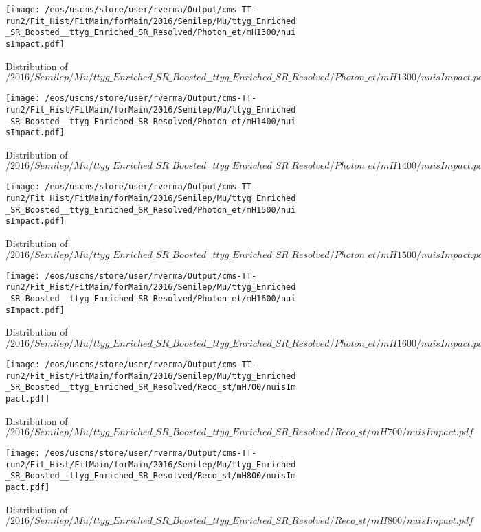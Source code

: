 \begin{figure}
\centering
\texttt{[image: /eos/uscms/store/user/rverma/Output/cms-TT-run2/Fit\_Hist/FitMain/forMain/2016/Semilep/Mu/ttyg\_Enriched\_SR\_Boosted\_\_ttyg\_Enriched\_SR\_Resolved/Photon\_et/mH1300/nuisImpact.pdf]}
\caption{Distribution of $/2016/Semilep/Mu/ttyg\_Enriched\_SR\_Boosted\_\_ttyg\_Enriched\_SR\_Resolved/Photon\_et/mH1300/nuisImpact.pdf$}
\end{figure}

\begin{figure}
\centering
\texttt{[image: /eos/uscms/store/user/rverma/Output/cms-TT-run2/Fit\_Hist/FitMain/forMain/2016/Semilep/Mu/ttyg\_Enriched\_SR\_Boosted\_\_ttyg\_Enriched\_SR\_Resolved/Photon\_et/mH1400/nuisImpact.pdf]}
\caption{Distribution of $/2016/Semilep/Mu/ttyg\_Enriched\_SR\_Boosted\_\_ttyg\_Enriched\_SR\_Resolved/Photon\_et/mH1400/nuisImpact.pdf$}
\end{figure}

\begin{figure}
\centering
\texttt{[image: /eos/uscms/store/user/rverma/Output/cms-TT-run2/Fit\_Hist/FitMain/forMain/2016/Semilep/Mu/ttyg\_Enriched\_SR\_Boosted\_\_ttyg\_Enriched\_SR\_Resolved/Photon\_et/mH1500/nuisImpact.pdf]}
\caption{Distribution of $/2016/Semilep/Mu/ttyg\_Enriched\_SR\_Boosted\_\_ttyg\_Enriched\_SR\_Resolved/Photon\_et/mH1500/nuisImpact.pdf$}
\end{figure}

\begin{figure}
\centering
\texttt{[image: /eos/uscms/store/user/rverma/Output/cms-TT-run2/Fit\_Hist/FitMain/forMain/2016/Semilep/Mu/ttyg\_Enriched\_SR\_Boosted\_\_ttyg\_Enriched\_SR\_Resolved/Photon\_et/mH1600/nuisImpact.pdf]}
\caption{Distribution of $/2016/Semilep/Mu/ttyg\_Enriched\_SR\_Boosted\_\_ttyg\_Enriched\_SR\_Resolved/Photon\_et/mH1600/nuisImpact.pdf$}
\end{figure}

\begin{figure}
\centering
\texttt{[image: /eos/uscms/store/user/rverma/Output/cms-TT-run2/Fit\_Hist/FitMain/forMain/2016/Semilep/Mu/ttyg\_Enriched\_SR\_Boosted\_\_ttyg\_Enriched\_SR\_Resolved/Reco\_st/mH700/nuisImpact.pdf]}
\caption{Distribution of $/2016/Semilep/Mu/ttyg\_Enriched\_SR\_Boosted\_\_ttyg\_Enriched\_SR\_Resolved/Reco\_st/mH700/nuisImpact.pdf$}
\end{figure}

\begin{figure}
\centering
\texttt{[image: /eos/uscms/store/user/rverma/Output/cms-TT-run2/Fit\_Hist/FitMain/forMain/2016/Semilep/Mu/ttyg\_Enriched\_SR\_Boosted\_\_ttyg\_Enriched\_SR\_Resolved/Reco\_st/mH800/nuisImpact.pdf]}
\caption{Distribution of $/2016/Semilep/Mu/ttyg\_Enriched\_SR\_Boosted\_\_ttyg\_Enriched\_SR\_Resolved/Reco\_st/mH800/nuisImpact.pdf$}
\end{figure}

